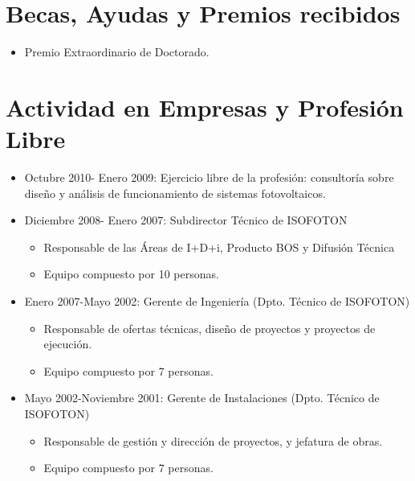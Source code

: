 \documentclass[article, a4paper]{memoir}
\begin{document}
\section{Becas, Ayudas y Premios recibidos}
\label{sec-10}

\begin{itemize}
\item Premio Extraordinario de Doctorado.
\end{itemize}


\section{Actividad en Empresas y Profesión Libre}
\label{sec-11}


\begin{itemize}
\item Octubre 2010- Enero 2009: Ejercicio libre de la profesión:
consultoría sobre diseño y análisis de funcionamiento de
sistemas fotovoltaicos.

\item Diciembre 2008- Enero 2007: Subdirector Técnico de ISOFOTON

\begin{itemize}
\item Responsable de las Áreas de I+D+i, Producto BOS y Difusión
Técnica
\item Equipo compuesto por 10 personas.
\end{itemize}
\end{itemize}


\begin{itemize}
\item Enero 2007-Mayo 2002: Gerente de Ingeniería (Dpto. Técnico de
ISOFOTON)

\begin{itemize}
\item Responsable de ofertas técnicas, diseño de proyectos y
proyectos de ejecución.
\item Equipo compuesto por 7 personas.
\end{itemize}
\end{itemize}


\begin{itemize}
\item Mayo 2002-Noviembre 2001: Gerente de Instalaciones
(Dpto. Técnico de ISOFOTON)

\begin{itemize}
\item Responsable de gestión y dirección de proyectos, y jefatura de
obras.
\item Equipo compuesto por 7 personas.
\end{itemize}
\end{itemize}
\end{document}
